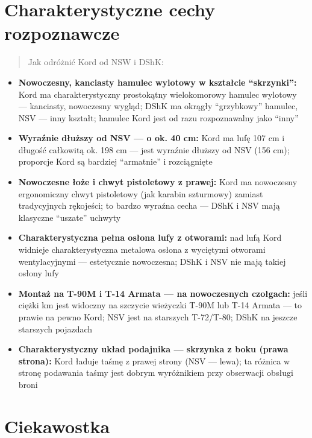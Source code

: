 \documentclass[12pt,openany,oneside]{book}
\providecommand{\tightlist}{%
  \setlength{\itemsep}{0pt}\setlength{\parskip}{0pt}}
\begin{document}
\section{Charakterystyczne cechy
rozpoznawcze}\label{charakterystyczne-cechy-rozpoznawcze-60}

\begin{quote}
Jak odróżnić Kord od NSW i DShK:
\end{quote}

\begin{itemize}
\tightlist
\item
  \textbf{Nowoczesny, kanciasty hamulec wylotowy w kształcie
  ``skrzynki'':} Kord ma charakterystyczny prostokątny wielokomorowy
  hamulec wylotowy --- kanciasty, nowoczesny wygląd; DShK ma okrągły
  ``grzybkowy'' hamulec, NSV --- inny kształt; hamulec Kord jest od razu
  rozpoznawalny jako ``inny''
\item
  \textbf{Wyraźnie dłuższy od NSV --- o ok. 40 cm:} Kord ma lufę 107 cm
  i długość całkowitą ok. 198 cm --- jest wyraźnie dłuższy od NSV (156
  cm); proporcje Kord są bardziej ``armatnie'' i rozciągnięte
\item
  \textbf{Nowoczesne łoże i chwyt pistoletowy z prawej:} Kord ma
  nowoczesny ergonomiczny chwyt pistoletowy (jak karabin szturmowy)
  zamiast tradycyjnych rękojeści; to bardzo wyraźna cecha --- DShK i NSV
  mają klasyczne ``uszate'' uchwyty
\item
  \textbf{Charakterystyczna pełna osłona lufy z otworami:} nad lufą Kord
  widnieje charakterystyczna metalowa osłona z wyciętymi otworami
  wentylacyjnymi --- estetycznie nowoczesna; DShK i NSV nie mają takiej
  osłony lufy
\item
  \textbf{Montaż na T-90M i T-14 Armata --- na nowoczesnych czołgach:}
  jeśli ciężki km jest widoczny na szczycie wieżyczki T-90M lub T-14
  Armata --- to prawie na pewno Kord; NSV jest na starszych T-72/T-80;
  DShK na jeszcze starszych pojazdach
\item
  \textbf{Charakterystyczny układ podajnika --- skrzynka z boku (prawa
  strona):} Kord ładuje taśmę z prawej strony (NSV --- lewa); ta różnica
  w stronę podawania taśmy jest dobrym wyróżnikiem przy obserwacji
  obsługi broni
\end{itemize}

\section{Ciekawostka}\label{ciekawostka-60}
\end{document}
